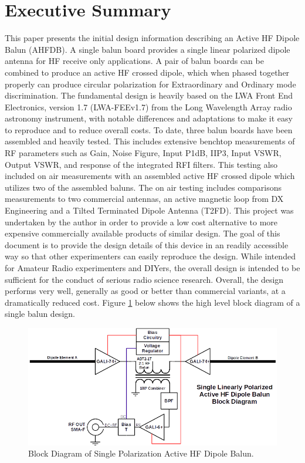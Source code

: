\newpage
\section{Executive Summary}
\label{sec:executive_summary}

This paper presents the initial design information describing an Active HF Dipole Balun (AHFDB).
A single balun board provides a single linear polarized dipole antenna for HF receive only applications.
A pair of balun boards can be combined to produce an active HF crossed dipole, which when phased together properly can produce circular polarization for Extraordinary and Ordinary mode discrimination.
The fundamental design is heavily based on the LWA Front End Electronics, version 1.7 (LWA-FEEv1.7) from the Long Wavelength Array radio astronomy instrument, with notable differences and adaptations to make it easy to reproduce and to reduce overall costs.
To date, three balun boards have been assembled and heavily tested.
This includes extensive benchtop measurements of RF parameters such as Gain, Noise Figure, Input P1dB, IIP3, Input VSWR, Output VSWR, and response of the integrated RFI filters.
This testing also included on air measurements with an assembled active HF crossed dipole which utilizes two of the assembled baluns.
The on air testing includes comparisons measurements to two commercial antennas, an active magnetic loop from DX Engineering and a Tilted Terminated Dipole Antenna (T2FD).
This project was undertaken by the author in order to provide a low cost alternative to more expensive commercially available products of similar design.
The goal of this document is to provide the design details of this device in an readily accessible way so that other experimenters can easily reproduce the design.
While intended for Amateur Radio experimenters and DIYers, the overall design is intended to be sufficient for the conduct of serious radio science research.
Overall, the design performs very well, generally as good or better than commercial variants, at a dramatically reduced cost.
Figure \ref{fig:block_diagram} below shows the high level block diagram of a single balun design.

\begin{figure}[h!]
  \centering
  \includegraphics[width=0.75\linewidth]{figures/balun_block_diagram_2.png}
  \caption{Block Diagram of Single Polarization Active HF Dipole Balun.}
  \label{fig:block_diagram}
\end{figure}
